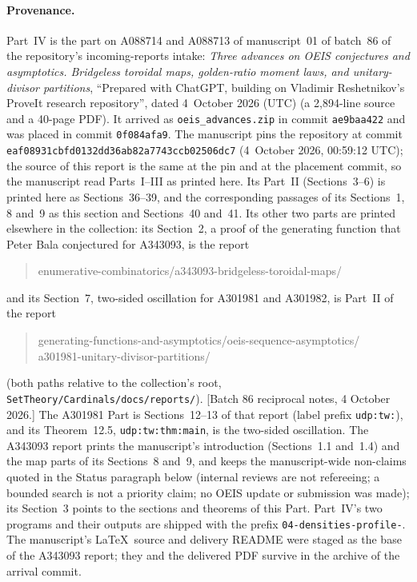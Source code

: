 \documentclass[11pt]{article}
\numberwithin{equation}{section}
\theoremstyle{definition}
\theoremstyle{remark}
\begin{document}
\paragraph{Provenance.}
Part~IV is the part on A088714 and A088713 of manuscript~01 of batch~86
of the repository's incoming-reports intake: \emph{Three advances on OEIS
conjectures and asymptotics. Bridgeless toroidal maps, golden-ratio
moment laws, and unitary-divisor partitions}, ``Prepared with ChatGPT,
building on Vladimir Reshetnikov's ProveIt research repository'', dated
4~October 2026 (UTC) (a 2{,}894-line source and a 40-page PDF). It
arrived as \nolinkurl{oeis_advances.zip} in commit \texttt{ae9baa422} and
was placed in commit \texttt{0f084afa9}. The manuscript pins the
repository at commit
\texttt{eaf08931cbfd0132dd36ab82a7743ccb02506dc7} (4~October 2026,
00:59:12 UTC); the source of this report is the same at the pin and at
the placement commit, so the manuscript read Parts~I--III as printed
here. Its Part~II (Sections~3--6) is printed here as Sections~36--39,
and the corresponding passages of its Sections~1, 8 and~9 as this
section and Sections~40 and~41. Its other two parts are printed
elsewhere in the collection: its Section~2, a proof of the generating
function that Peter Bala conjectured for A343093, is the report
\begin{quote}\small\ttfamily
enumerative-combinatorics/a343093-bridgeless-toroidal-maps/
\end{quote}
and its Section~7, two-sided oscillation for A301981 and A301982, is
Part~II of the report
\begin{quote}\small\ttfamily
generating-functions-and-asymptotics/oeis-sequence-asymptotics/\\
a301981-unitary-divisor-partitions/
\end{quote}
(both paths relative to the collection's root,
\texttt{SetTheory/Cardinals/docs/reports/}).
[Batch 86 reciprocal notes, 4 October 2026.] The A301981 Part is
Sections~12--13 of that report (label prefix \texttt{udp:tw:}), and its
Theorem~12.5, \nolinkurl{udp:tw:thm:main}, is the two-sided oscillation.
The A343093 report prints the manuscript's introduction (Sections~1.1
and~1.4) and the map parts of its Sections~8 and~9, and keeps the
manuscript-wide non-claims quoted in the Status paragraph below (internal
reviews are not refereeing; a bounded search is not a priority claim; no
OEIS update or submission was made); its Section~3 points to the
sections and theorems of this Part.
Part~IV's two programs and their outputs are shipped with the prefix
\texttt{04-densities-profile-}. The manuscript's \LaTeX\ source and
delivery README were staged as the base of the A343093 report; they and
the delivered PDF survive in the archive of the arrival commit.
\end{document}
